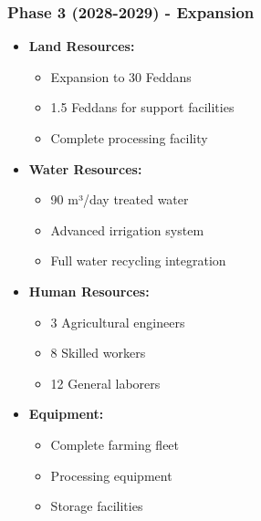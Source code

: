 \subsubsection{Phase 3 (2028-2029) - Expansion}
\begin{itemize}
    \item \textbf{Land Resources:}
    \begin{itemize}
        \item Expansion to 30 Feddans
        \item 1.5 Feddans for support facilities
        \item Complete processing facility
    \end{itemize}
    \item \textbf{Water Resources:}
    \begin{itemize}
        \item 90 m³/day treated water
        \item Advanced irrigation system
        \item Full water recycling integration
    \end{itemize}
    \item \textbf{Human Resources:}
    \begin{itemize}
        \item 3 Agricultural engineers
        \item 8 Skilled workers
        \item 12 General laborers
    \end{itemize}
    \item \textbf{Equipment:}
    \begin{itemize}
        \item Complete farming fleet
        \item Processing equipment
        \item Storage facilities
    \end{itemize}
\end{itemize}

